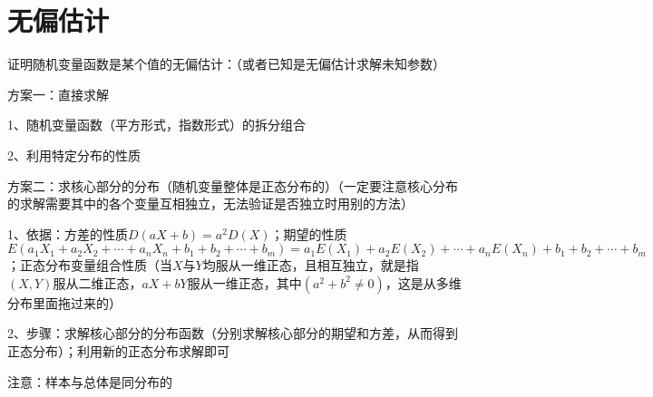 \section{无偏估计}

证明随机变量函数是某个值的无偏估计：（或者已知是无偏估计求解未知参数）

方案一：直接求解

1、随机变量函数（平方形式，指数形式）的拆分组合

2、利用特定分布的性质

方案二：求核心部分的分布（随机变量整体是正态分布的）（一定要注意核心分布的求解需要其中的各个变量互相独立，无法验证是否独立时用别的方法）

1、依据：方差的性质$D(a X+b)=a^{2} D(X) $；期望的性质$E(a_1X_1+a_2X_2+\cdots+a_nX_n+b_1+b_2+\cdots+b_m)=a_1E(X_1)+a_2E(X_2)+\cdots+a_nE(X_n)+b_1+b_2+\cdots+b_m$；正态分布变量组合性质（当$X$与$Y$均服从一维正态，且相互独立，就是指$(X, Y)$服从二维正态，$a X+b Y$服从一维正态，其中$\left(a^{2}+b^{2} \neq 0\right)$，这是从多维分布里面拖过来的）

2、步骤：求解核心部分的分布函数（分别求解核心部分的期望和方差，从而得到正态分布）；利用新的正态分布求解即可

注意：样本与总体是同分布的


